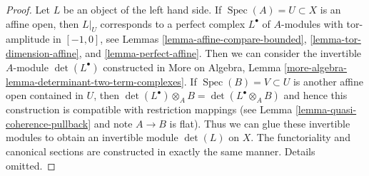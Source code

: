 \documentclass{stacks-project}
\theoremstyle{plain}
\theoremstyle{definition}
\theoremstyle{remark}
\numberwithin{equation}{subsection}
\def\Spec{\mathop{\mathrm{Spec}}}
\begin{document}
\begin{proof}
Let $L$ be an object of the left hand side. If $\Spec(A) = U \subset X$
is an affine open, then $L|_U$ corresponds to a perfect complex $L^\bullet$
of $A$-modules with tor-amplitude in $[-1, 0]$, see
Lemmas \ref{lemma-affine-compare-bounded},
\ref{lemma-tor-dimension-affine}, and
\ref{lemma-perfect-affine}.
Then we can consider the invertible $A$-module $\det(L^\bullet)$ constructed in
More on Algebra, Lemma \ref{more-algebra-lemma-determinant-two-term-complexes}.
If $\Spec(B) = V \subset U$ is another affine open contained in $U$,
then $\det(L^\bullet) \otimes_A B = \det(L^\bullet \otimes_A B)$
and hence this construction is compatible with restriction mappings
(see Lemma \ref{lemma-quasi-coherence-pullback} and note $A \to B$ is flat).
Thus we can glue these invertible modules to obtain an invertible module
$\det(L)$ on $X$. The functoriality and canonical sections
are constructed in exactly the same manner. Details omitted.
\end{proof}
\end{document}
